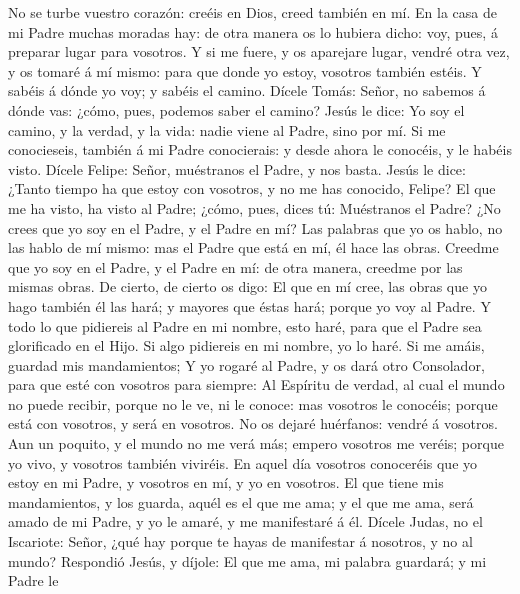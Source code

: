  No se turbe vuestro corazón: creéis en Dios, creed
también en mí.  En la casa de mi Padre muchas moradas hay:
de otra manera os lo hubiera dicho: voy, pues, á preparar lugar para
vosotros.  Y si me fuere, y os aparejare lugar, vendré
otra vez, y os tomaré á mí mismo: para que donde yo estoy, vosotros
también estéis.  Y sabéis á dónde yo voy; y sabéis el
camino.  Dícele Tomás: Señor, no sabemos á dónde vas:
¿cómo, pues, podemos saber el camino?  Jesús le dice: Yo
soy el camino, y la verdad, y la vida: nadie viene al Padre, sino por
mí.  Si me conocieseis, también á mi Padre conocierais: y
desde ahora le conocéis, y le habéis visto.  Dícele
Felipe: Señor, muéstranos el Padre, y nos basta.  Jesús le
dice: ¿Tanto tiempo ha que estoy con vosotros, y no me has conocido,
Felipe? El que me ha visto, ha visto al Padre; ¿cómo, pues, dices tú:
Muéstranos el Padre?  ¿No crees que yo soy en el Padre, y
el Padre en mí? Las palabras que yo os hablo, no las hablo de mí mismo:
mas el Padre que está en mí, él hace las obras.  Creedme
que yo soy en el Padre, y el Padre en mí: de otra manera, creedme por
las mismas obras.  De cierto, de cierto os digo: El que
en mí cree, las obras que yo hago también él las hará; y mayores que
éstas hará; porque yo voy al Padre.  Y todo lo que
pidiereis al Padre en mi nombre, esto haré, para que el Padre sea
glorificado en el Hijo.  Si algo pidiereis en mi nombre,
yo lo haré.  Si me amáis, guardad mis mandamientos;
 Y yo rogaré al Padre, y os dará otro Consolador, para
que esté con vosotros para siempre:  Al Espíritu de
verdad, al cual el mundo no puede recibir, porque no le ve, ni le
conoce: mas vosotros le conocéis; porque está con vosotros, y será en
vosotros.  No os dejaré huérfanos: vendré á vosotros.
 Aun un poquito, y el mundo no me verá más; empero
vosotros me veréis; porque yo vivo, y vosotros también viviréis.
 En aquel día vosotros conoceréis que yo estoy en mi
Padre, y vosotros en mí, y yo en vosotros.  El que tiene
mis mandamientos, y los guarda, aquél es el que me ama; y el que me ama,
será amado de mi Padre, y yo le amaré, y me manifestaré á él.
 Dícele Judas, no el Iscariote: Señor, ¿qué hay porque te
hayas de manifestar á nosotros, y no al mundo?  Respondió
Jesús, y díjole: El que me ama, mi palabra guardará; y mi Padre le
